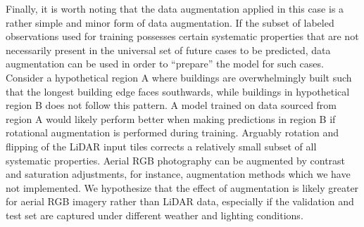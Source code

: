 Finally, it is worth noting that the data augmentation applied in this case is a rather simple and minor form of data augmentation.
If the subset of labeled observations used for training possesses certain systematic properties that are not necessarily present in the universal set of future cases to be predicted, data augmentation can be used in order to \enquote{prepare} the model for such cases.
Consider a hypothetical region A where buildings are overwhelmingly built such that the longest building edge faces southwards, while buildings in hypothetical region B does not follow this pattern.
A model trained on data sourced from region A would likely perform better when making predictions in region B if rotational augmentation is performed during training.
Arguably rotation and flipping of the LiDAR input tiles corrects a relatively small subset of all systematic properties.
Aerial RGB photography can be augmented by contrast and saturation adjustments, for instance, augmentation methods which we have not implemented.
We hypothesize that the effect of augmentation is likely greater for aerial RGB imagery rather than LiDAR data, especially if the validation and test set are captured under different weather and lighting conditions.

